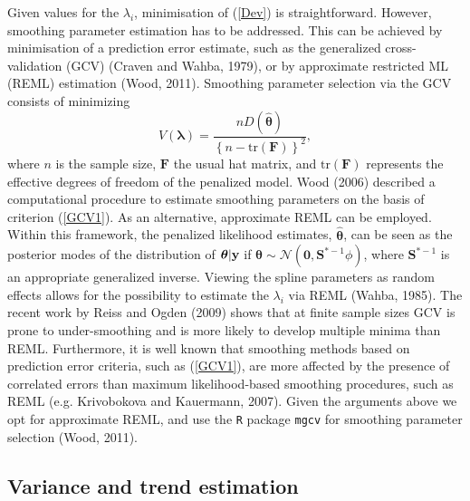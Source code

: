 Given values for the $\lambda_i$, minimisation of (\ref{Dev}) is straightforward. However, smoothing parameter estimation has to be addressed. This can be achieved by minimisation of a prediction error estimate, such as the generalized cross-validation (GCV) (Craven and Wahba, 1979), or by approximate restricted ML (REML) estimation (Wood, 2011). Smoothing parameter selection via the GCV consists of minimizing 
\begin{equation}
V(\bm\lambda)=\frac{nD(\hat{\bm\theta})}{\left\{n-\text{tr}(\textbf{F})\right\}^2},
\label{GCV1}
\end{equation}
where $n$ is the sample size, $\textbf{F}$ the usual hat matrix, and $\text{tr}(\textbf{F})$ represents the effective degrees of freedom of the penalized model. Wood (2006) described a computational procedure to estimate smoothing parameters on the basis of criterion (\ref{GCV1}). As an alternative, approximate REML can be employed. Within this framework, the penalized likelihood estimates, $\hat{\bm\theta}$, can be seen as the posterior modes of the distribution of $\bm\theta|{\bf y}$ if $\bm\theta \sim \mathcal{N}(\textbf{0},\textbf{S}^{*-1}\phi)$, where $\textbf{S}^{*-1}$ is an appropriate generalized inverse. Viewing the spline parameters as random effects allows for the possibility to estimate the $\lambda_i$ via REML (Wahba, 1985). The recent work by Reiss and Ogden (2009) shows that at finite sample sizes GCV is prone to under-smoothing and is more likely to develop multiple minima than REML. Furthermore, it is well known that smoothing methods based on prediction error criteria, such as (\ref{GCV1}), are more affected by the presence of correlated errors than maximum likelihood-based smoothing procedures, such as REML (e.g. Krivobokova and Kauermann, 2007). Given the arguments above we opt for approximate REML, and use the \texttt{R} package \texttt{mgcv} for smoothing parameter selection (Wood, 2011). 

\subsection{Variance and trend estimation \label{VE}}

